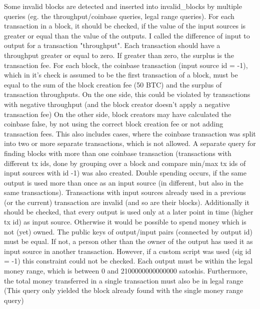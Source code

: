 \documentclass[12pt,a4paper]{article}
\begin{document}
\newline\newline
Some invalid blocks are detected and inserted into invalid\_blocks by multiple queries (eg. the throughput/coinbase queries, legal range queries).
\newline\newline
For each transaction in a block, it should be checked, if the value of the
input sources is greater or equal than the value of the outputs. I called the difference of input to output for a transaction "throughput".
Each transaction should have a throughput greater or equal to zero. If greater than zero, the surplus is the transaction fee.\newline
\newline
For each block, the coinbase transaction (input source id = -1), which in it's check is assumed to be the first transaction of a block, must be equal to the sum of the block creation fee (50 BTC)
and the surplus of transaction throughputs.\newline
On the one side, this could be violated by transactions with negative throughput (and the block creator doesn't apply a negative transaction fee)\newline
On the other side, block creators may have calculated the coinbase false, by not using the correct block creation fee or not adding transaction fees. This also includes cases, where the coinbase transaction was
split into two or more separate transactions, which is not allowed.
A separate query for finding blocks with more than one coinbase transaction (transactions with different tx ids, done by grouping over a block and compare min/max tx ids of input sources with id -1) was also created.\newline
\newline
Double spending occurs, if the same output is used more than once as an input source (in different, but also in the same transactions). Transactions with input sources already
used in a previous (or the current) transaction are invalid (and so are their blocks).\newline
Additionally it should be checked, that every output is used only at a later point in time (higher tx id) as input source.
Otherwise it would be possible to spend money which is not (yet) owned.\newline
\newline
The public keys of output/input pairs (connected by output id) must be equal. If not, a person other than the owner of the output has used it as
input source in another transaction. However, if a custom script was used (sig id = -1) this constraint could not be checked.\newline
\newline
Each output must be within the legal money range, which is between 0 and 2100000000000000 satoshis.\newline
Furthermore, the total money transferred in a single transaction must also be in legal range (This query only yielded the block already found with the single money range query)\newline
\end{document}
